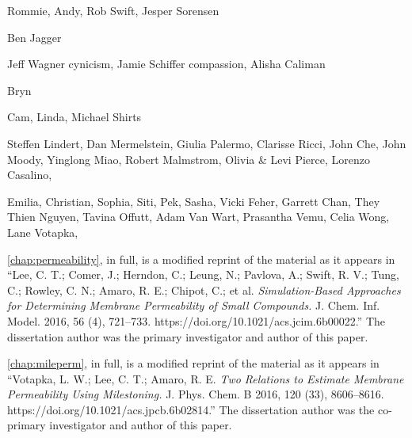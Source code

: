 \begin{frontmatter}
%
\tableofcontents
\listoffigures  %
\listoftables   %



%
%
\begin{acknowledgements}
\par Rommie, Andy, Rob Swift, Jesper Sorensen
\par Ben Jagger
\par Jeff Wagner cynicism, Jamie Schiffer compassion, Alisha Caliman
\par Bryn

\par Cam, Linda, Michael Shirts

\par Steffen Lindert, Dan Mermelstein, Giulia Palermo, Clarisse Ricci, John Che, John Moody, Yinglong Miao, Robert Malmstrom, Olivia \& Levi Pierce, Lorenzo Casalino,

\par Emilia, Christian, Sophia, Siti, Pek, Sasha, Vicki Feher, Garrett Chan, They Thien Nguyen, Tavina Offutt, Adam Van Wart, Prasantha Vemu, Celia Wong, Lane Votapka,

\par \cref{chap:permeability}, in full, is a modified reprint of the material as it appears in ``Lee, C. T.; Comer, J.; Herndon, C.; Leung, N.; Pavlova, A.; Swift, R. V.; Tung, C.; Rowley, C. N.; Amaro, R. E.; Chipot, C.; et al. \emph{Simulation-Based Approaches for Determining Membrane Permeability of Small Compounds.} J. Chem. Inf. Model. 2016, 56 (4), 721–733. https://doi.org/10.1021/acs.jcim.6b00022.''
The dissertation author was the primary investigator and author of this paper.

\par \cref{chap:mileperm}, in full, is a modified reprint of the material as it appears in ``Votapka, L. W.; Lee, C. T.; Amaro, R. E. \emph{Two Relations to Estimate Membrane Permeability Using Milestoning.} J. Phys. Chem. B 2016, 120 (33), 8606–8616. https://doi.org/10.1021/acs.jpcb.6b02814.''
The dissertation author was the co-primary investigator and author of this paper.


\end{acknowledgements}
\end{frontmatter}
